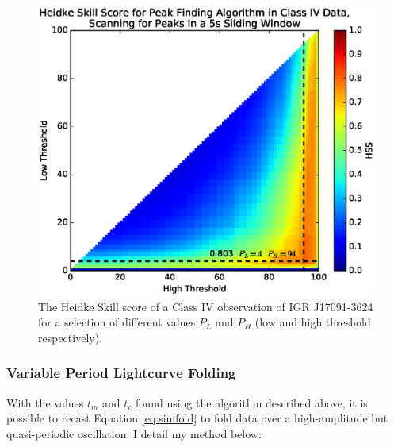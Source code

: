 \begin{figure}
    \includegraphics[width=\columnwidth, trim = 0mm 10mm 0mm 10mm]{images/HSS_J.eps}
    \captionsetup{singlelinecheck=off}
    \caption{The Heidke Skill score of a Class IV observation of IGR J17091-3624 for a selection of different values $P_L$ and $P_H$ (low and high threshold respectively).}
   \label{fig:Heidke}
\end{figure}

\subsubsection{Variable Period Lightcurve Folding}

\par With the values $t_m$ and $t_c$ found using the algorithm described above, it is possible to recast Equation \ref{eq:simfold} to fold data over a high-amplitude but quasi-periodic oscillation.  I detail my method below:


